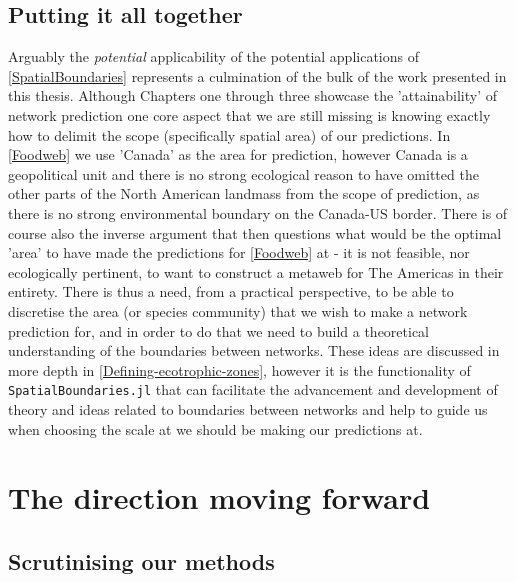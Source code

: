 \subsection{Putting it all together}

Arguably the \emph{potential} applicability of the potential applications of \autoref{SpatialBoundaries} represents a culmination of the bulk of the work presented in this thesis. Although Chapters one through three showcase the 'attainability' of network prediction one core aspect that we are still missing is knowing exactly how to delimit the scope (specifically spatial area) of our predictions. In \autoref{Foodweb} we use 'Canada' as the area for prediction, however Canada is a geopolitical unit and there is no strong ecological reason to have omitted the other parts of the North American landmass from the scope of prediction, as there is no strong environmental boundary on the Canada-US border. There is of course also the inverse argument that then questions what would be the optimal 'area' to have made the predictions for \autoref{Foodweb} at - it is not feasible, nor ecologically pertinent, to want to construct a metaweb for The Americas in their entirety. There is thus a need, from a practical perspective, to be able to discretise the area (or species community) that we wish to make a network prediction for, and in order to do that we need to build a theoretical understanding of the boundaries between networks. These ideas are discussed in more depth in \autoref{Defining-ecotrophic-zones}, however it is the functionality of \texttt{SpatialBoundaries.jl} that can facilitate the advancement and development of theory and ideas related to boundaries between networks and help to guide us when choosing the scale at we should be making our predictions at.

\section{The direction moving forward}

\subsection{Scrutinising our methods}

